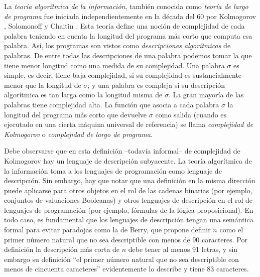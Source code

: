 La {\em teoría algorítmica de la información}, también
conocida como {\em teoría de largo de programa} fue iniciada
independientemente en la década del 60 por Kolmogorov \cite{kolmogorov1965three},
Solomonoff \cite{solomonoff1964formal} y Chaitin \cite{chaitin1969length}. 
Esta teoría define una
noción de complejidad de cada palabra teniendo en cuenta la longitud
del programa más corto que computa esa palabra. Así, los programas
son vistos como {\em descripciones algorítmicas} de palabras. De
entre todas las descripciones de una palabra podemos tomar la que
tiene menor longitud como una medida de su complejidad. Una palabra
$\sigma$ es simple, es decir, tiene baja complejidad, si su
complejidad es sustancialmente menor que la longitud de $\sigma$; y
una palabra es compleja si su descripción algorítmica es tan larga
como la longitud misma de $\sigma$. La gran mayoría
de las palabras tiene complejidad alta. La función que asocia a cada
palabra $\sigma$ la longitud del programa más corto que devuelve
$\sigma$ como salida (cuando es ejecutado en una cierta máquina
universal de referencia) se llama {\em complejidad de Kolmogorov} o
{\em complejidad de largo de programa}.

Debe
observarse que en esta definición --todavía informal-- 
de complejidad de Kolmogorov hay
un lenguaje de descripción subyacente. La teoría algorítmica de la información
toma a los lenguajes de programación como lenguaje de descripción. Sin embargo, 
hay que notar que una definición en la misma dirección puede aplicarse para 
otros objetos en el rol de las cadenas binarias (por ejemplo, conjuntos de valuaciones 
Booleanas) y otros lenguajes de descripción en el rol de lenguajes de programación
(por ejemplo, fórmulas de la lógica proposicional). En todo caso, es fundamental
que los lenguajes de descripción tengan una semántica formal para evitar paradojas
como la de Berry, que propone definir $n$ como el primer número natural que no sea 
descriptible con menos de 90 caracteres. Por definición la descripción más corta de $n$ debe tener 
al menos 91 letras, y sin embargo su definición ``el primer número natural que no sea 
descriptible con menos de cincuenta caracteres'' evidentemente lo describe y tiene 83 caracteres.


